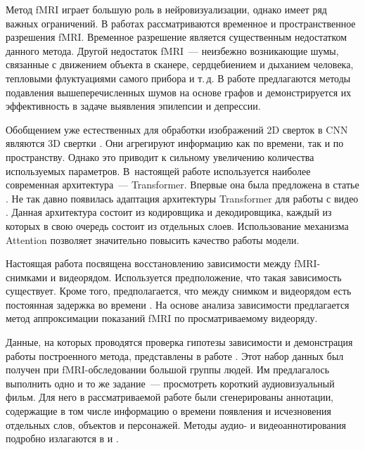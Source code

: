 \documentclass[a4paper, 12pt]{article}
\begin{document}
	Метод fMRI играет большую роль в нейровизуализации, однако имеет ряд важных ограничений.
	В работах \citep{menon1999spatial, logothetis2008we} рассматриваются 
	временное и пространственное разрешения fMRI. Временное разрешение является существенным
	недостатком данного метода. Другой недостаток fMRI~--- неизбежно возникающие шумы, 
	связанные с движением объекта в сканере, сердцебиением и дыханием человека, тепловыми
	флуктуациями самого прибора и т.\,д. В работе \citep{1804.10167} предлагаются методы 
	подавления вышеперечисленных шумов на основе графов и демонстрируется их эффективность в задаче
	выявления эпилепсии и депрессии.

	Обобщением уже естественных для обработки изображений 2D сверток в CNN являются 3D
	свертки \citep{Tran_2015_ICCV}.
	Они агрегируют информацию как по времени, так и по пространству.
	Однако это приводит к сильному увеличению количества используемых параметров.
	В~настоящей работе используется наиболее современная архитектура~--- Transformer.
	Впервые она была предложена в статье \citep{https://doi.org/10.48550/arxiv.1706.03762}.
	Не так давно появилась адаптация архитектуры Transformer для работы с видео
	\citep{https://doi.org/10.48550/arxiv.2201.04288}. Данная архитектура состоит из кодировщика
	и декодировщика, каждый из которых в свою очередь состоит из отдельных слоев. Использование 
	механизма Attention \citep{https://doi.org/10.48550/arxiv.1706.03762} 
	позволяет значительно повысить качество работы модели.

	Настоящая работа посвящена восстановлению зависимости между fMRI-снимками и видеорядом.
	Используется предположение, что такая зависимость существует.
	Кроме того, предполагается, что между снимком и видеорядом есть постоянная задержка во времени
	\citep{Logothetis2003}.
	На основе анализа зависимости предлагается метод аппроксимации показаний fMRI по
	просматриваемому видеоряду.

	Данные, на которых проводятся проверка гипотезы зависимости и демонстрация работы построенного 
	метода, представлены в работе \citep{Berezutskaya2022}. Этот набор данных был получен при
	fMRI-обследовании большой группы людей. Им предлагалось выполнить одно и то же задание~---
	просмотреть короткий аудиовизуальный фильм. Для него в рассматриваемой работе были 
	сгенерированы аннотации, содержащие в том числе информацию о времени появления и исчезновения
	отдельных слов, объектов и персонажей. Методы аудио- и видеоаннотирования подробно излагаются в
	\citep{boersma2018praat} и \citep{Berezutskaya2020}. 
\end{document}
